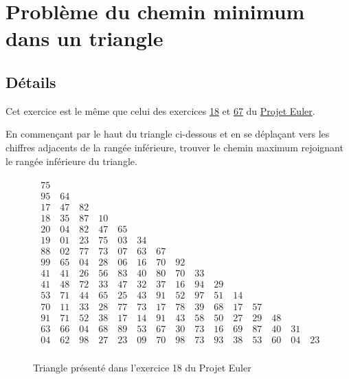 \documentclass[a4paper,english,french]{article}
\begin{document}
\section{Problème du chemin minimum dans un triangle}

\subsection*{Détails}

Cet exercice est le même que celui des exercices \href{https://projecteuler.net/problem=18}{18} et \href{https://projecteuler.net/problem=67}{67} du \href{https://projecteuler.net}{Projet Euler}.

En commençant par le haut du triangle ci-dessous et en se déplaçant vers les chiffres adjacents de la rangée inférieure, trouver le chemin maximum rejoignant le rangée inférieure du triangle.

\begin{figure}
\centering
\begin{equation*}
\begin{array}{c}
\begin{array}{c}
75 \\
95 \quad 64 \\
17 \quad 47 \quad 82 \\
18 \quad 35 \quad 87 \quad 10 \\
20 \quad 04 \quad 82 \quad 47 \quad 65 \\
19 \quad 01 \quad 23 \quad 75 \quad 03 \quad 34 \\
88 \quad 02 \quad 77 \quad 73 \quad 07 \quad 63 \quad 67 \\
99 \quad 65 \quad 04 \quad 28 \quad 06 \quad 16 \quad 70 \quad 92 \\
41 \quad 41 \quad 26 \quad 56 \quad 83 \quad 40 \quad 80 \quad 70 \quad 33 \\
41 \quad 48 \quad 72 \quad 33 \quad 47 \quad 32 \quad 37 \quad 16 \quad 94 \quad 29 \\
53 \quad 71 \quad 44 \quad 65 \quad 25 \quad 43 \quad 91 \quad 52 \quad 97 \quad 51 \quad 14 \\
70 \quad 11 \quad 33 \quad 28 \quad 77 \quad 73 \quad 17 \quad 78 \quad 39 \quad 68 \quad 17 \quad 57 \\
91 \quad 71 \quad 52 \quad 38 \quad 17 \quad 14 \quad 91 \quad 43 \quad 58 \quad 50 \quad 27 \quad 29 \quad 48 \\
63 \quad 66 \quad 04 \quad 68 \quad 89 \quad 53 \quad 67 \quad 30 \quad 73 \quad 16 \quad 69 \quad 87 \quad 40 \quad 31 \\
04 \quad 62 \quad 98 \quad 27 \quad 23 \quad 09 \quad 70 \quad 98 \quad 73 \quad 93 \quad 38 \quad 53 \quad 60 \quad 04 \quad 23 \\
\end{array}
\end{array}
\end{equation*}
\caption{Triangle présenté dans l'exercice 18 du Projet Euler}
\end{figure}
\end{document}
